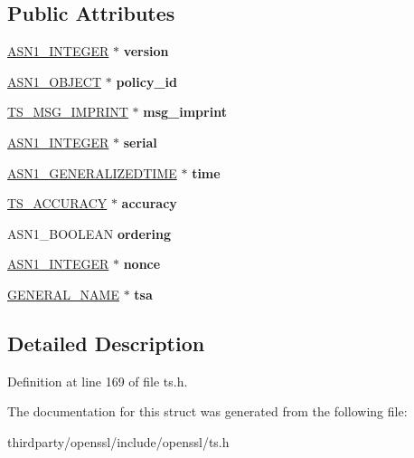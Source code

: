 \subsection*{Public Attributes}
\begin{DoxyCompactItemize}
\item 
\mbox{\label{struct_t_s__tst__info__st_ad0e7ab1536c6e4ecae58bc6f0538b4dc}} 
\hyperlink{structasn1__string__st}{A\+S\+N1\+\_\+\+I\+N\+T\+E\+G\+ER} $\ast$ {\bfseries version}
\item 
\mbox{\label{struct_t_s__tst__info__st_a59787f93711b76c27283f254d4a767b3}} 
\hyperlink{structasn1__object__st}{A\+S\+N1\+\_\+\+O\+B\+J\+E\+CT} $\ast$ {\bfseries policy\+\_\+id}
\item 
\mbox{\label{struct_t_s__tst__info__st_adae22a923e0d2be1b9b42a1b65ad6421}} 
\hyperlink{struct_t_s__msg__imprint__st}{T\+S\+\_\+\+M\+S\+G\+\_\+\+I\+M\+P\+R\+I\+NT} $\ast$ {\bfseries msg\+\_\+imprint}
\item 
\mbox{\label{struct_t_s__tst__info__st_ab450625d8b03f76e3382e5f3b6a35896}} 
\hyperlink{structasn1__string__st}{A\+S\+N1\+\_\+\+I\+N\+T\+E\+G\+ER} $\ast$ {\bfseries serial}
\item 
\mbox{\label{struct_t_s__tst__info__st_a8b6a1201796f7e1b5b961ee86ab55681}} 
\hyperlink{structasn1__string__st}{A\+S\+N1\+\_\+\+G\+E\+N\+E\+R\+A\+L\+I\+Z\+E\+D\+T\+I\+ME} $\ast$ {\bfseries time}
\item 
\mbox{\label{struct_t_s__tst__info__st_a4ffba57649f2c0e48348a2c2894de46b}} 
\hyperlink{struct_t_s__accuracy__st}{T\+S\+\_\+\+A\+C\+C\+U\+R\+A\+CY} $\ast$ {\bfseries accuracy}
\item 
\mbox{\label{struct_t_s__tst__info__st_a4410b2d0d0f5ebc631a41804c0a92ad8}} 
A\+S\+N1\+\_\+\+B\+O\+O\+L\+E\+AN {\bfseries ordering}
\item 
\mbox{\label{struct_t_s__tst__info__st_af2de206a30ac43b6c0048e1b78774ca4}} 
\hyperlink{structasn1__string__st}{A\+S\+N1\+\_\+\+I\+N\+T\+E\+G\+ER} $\ast$ {\bfseries nonce}
\item 
\mbox{\label{struct_t_s__tst__info__st_aa4b23c96f4a2a053c56b46f7622a4a2c}} 
\hyperlink{struct_g_e_n_e_r_a_l___n_a_m_e__st}{G\+E\+N\+E\+R\+A\+L\+\_\+\+N\+A\+ME} $\ast$ {\bfseries tsa}
\end{DoxyCompactItemize}


\subsection{Detailed Description}


Definition at line 169 of file ts.\+h.



The documentation for this struct was generated from the following file\+:\begin{DoxyCompactItemize}
\item 
thirdparty/openssl/include/openssl/ts.\+h\end{DoxyCompactItemize}
